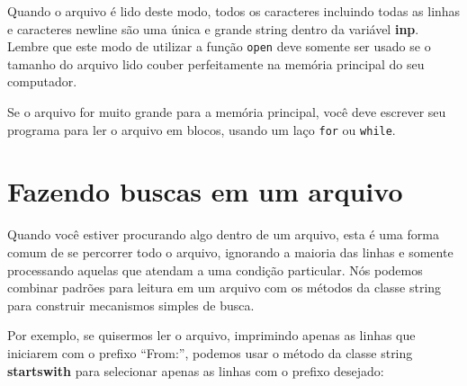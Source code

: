 Quando o arquivo é lido deste modo, todos os caracteres incluindo 
todas as linhas e caracteres newline são uma única e grande string
dentro da variável {\bf inp}.
Lembre que este modo de utilizar a função {\tt open} deve somente ser
usado se o tamanho do arquivo lido couber perfeitamente na memória 
principal do seu computador.

Se o arquivo for muito grande para a memória principal, você deve
escrever seu programa para ler o arquivo em blocos, usando um laço 
{\tt for} ou {\tt while}.

\section{Fazendo buscas em um arquivo}

Quando você estiver procurando algo dentro de um arquivo, esta
é uma forma comum de se percorrer todo o arquivo, ignorando a 
maioria das linhas e somente processando aquelas que atendam a uma
condição particular. Nós podemos combinar padrões para leitura em
um arquivo com os métodos da classe string para construir mecanismos 
simples de busca.


Por exemplo, se quisermos ler o arquivo, imprimindo apenas as linhas
que iniciarem com o prefixo ``From:'', podemos usar o método da classe 
string {\bf startswith} para selecionar apenas as linhas com o prefixo 
desejado:

